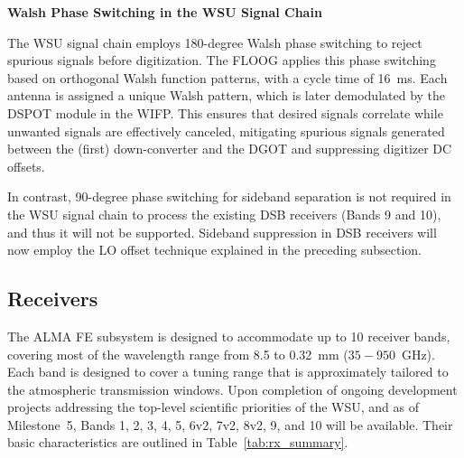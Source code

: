 \noindent
\textbf{Walsh Phase Switching in the WSU Signal Chain}

The \ac{WSU} signal chain employs 180-degree Walsh phase switching to reject spurious signals before digitization.
The \ac{FLOOG} applies this phase switching based on orthogonal Walsh function patterns, with a cycle time of 16~ms.
Each antenna is assigned a unique Walsh pattern, which is later demodulated by the \ac{DSPOT} module in the \ac{WIFP}.
This ensures that desired signals correlate while unwanted signals are effectively canceled, mitigating spurious signals generated between the (first) down-converter and the \ac{DGOT} and suppressing digitizer DC offsets.

In contrast, 90-degree phase switching for sideband separation is not required in the \ac{WSU} signal chain to process the existing \ac{DSB} receivers (Bands 9 and 10), and thus it will not be supported. Sideband suppression in \ac{DSB} receivers will now employ the LO offset technique explained in the preceding subsection.


\subsection{Receivers}
\label{sec:receivers}


The ALMA \ac{FE} subsystem is designed to accommodate up to 10 receiver bands, covering most of the wavelength range from 8.5 to 0.32~mm ($35-950$~GHz).
Each band is designed to cover a tuning range that is approximately tailored to the atmospheric transmission windows.
Upon completion of ongoing development projects addressing the top-level scientific priorities of the \ac{WSU}, and as of Milestone~5, Bands 1, 2, 3, 4, 5, 6v2, 7v2, 8v2, 9, and 10 will be available. Their basic characteristics are outlined in Table~\ref{tab:rx_summary}.


